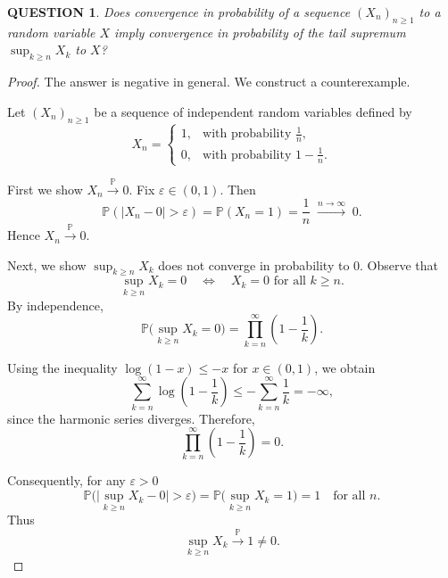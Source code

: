 \documentclass[12pt]{article}
\renewcommand{\(}{\left(}%
\renewcommand{\)}{\right)}%
\renewcommand{\[}{\left[}%
\renewcommand{\]}{\right]}%
\newcommand{\p}{\mathbb{P}}
\newtheorem{question}{QUESTION}[section]}
\newtheorem{proof}{Proof.}}
\begin{document}
\begin{question}
Does convergence in probability of a sequence $(X_n)_{n\ge1}$ to a random variable $X$
imply convergence in probability of the tail supremum $\sup_{k\ge n} X_k$
to $X$?
\end{question}

\begin{proof}
The answer is negative in general. We construct a counterexample.

Let $(X_n)_{n\ge1}$ be a sequence of independent random variables defined by
\begin{equation*}
X_n =
\begin{cases}
1, & \text{with probability } \frac{1}{n},\\[4pt]
0, & \text{with probability } 1-\frac{1}{n}.
\end{cases}
\end{equation*}

First we show $X_n \xrightarrow{\mathbb P} 0$. Fix $\varepsilon\in(0,1)$. Then
\begin{equation*}
\mathbb P(|X_n-0|>\varepsilon)
=
\mathbb P(X_n=1)
=
\frac{1}{n}
\;\xrightarrow[]{n\to\infty}\;0.
\end{equation*}
Hence $X_n \xrightarrow{\mathbb P} 0$.

Next, we show $\sup_{k\ge n} X_k$ does not converge in probability to $0$. Observe that
\begin{equation*}
\sup_{k\ge n} X_k = 0
\quad\Longleftrightarrow\quad
X_k=0 \text{ for all } k\ge n.
\end{equation*}
By independence,
\begin{equation*}
\mathbb P\Big(\sup_{k\ge n} X_k = 0\Big)
=
\prod_{k=n}^{\infty}\left(1-\frac{1}{k}\right).
\end{equation*}

Using the inequality $\log(1-x)\le -x$ for $x\in(0,1)$, we obtain
\begin{equation*}
\sum_{k=n}^{\infty}\log\!\left(1-\frac{1}{k}\right)
\le
-\sum_{k=n}^{\infty}\frac{1}{k}
=
-\infty,
\end{equation*}
since the harmonic series diverges. Therefore,
\begin{equation*}
\prod_{k=n}^{\infty}\left(1-\frac{1}{k}\right)=0.
\end{equation*}

Consequently, for any $\varepsilon>0$
\begin{equation*}
\p\Big(\big|\sup_{k\ge n} X_k-0\big|>\varepsilon\Big)= \mathbb P\Big(\sup_{k\ge n} X_k = 1\Big)=1
\quad \text{for all } n.
\end{equation*}
Thus 
\begin{equation*}
\sup_{k\ge n} X_k \xrightarrow{\mathbb P} 1 \neq 0.
\end{equation*}
\end{proof}
\end{document}
